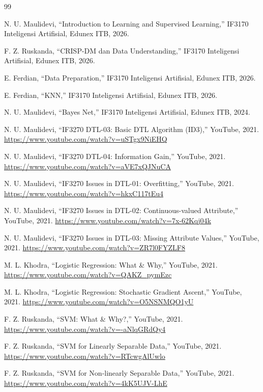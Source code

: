 \begin{thebibliography}{99}

 N. U. Maulidevi, ``Introduction to Learning and Supervised Learning,'' IF3170 Inteligensi Artifisial, Edunex ITB, 2026.

 F. Z. Ruskanda, ``CRISP-DM dan Data Understanding,'' IF3170 Inteligensi Artifisial, Edunex ITB, 2026.

 E. Ferdian, ``Data Preparation,'' IF3170 Inteligensi Artifisial, Edunex ITB, 2026.

 E. Ferdian, ``KNN,'' IF3170 Inteligensi Artifisial, Edunex ITB, 2026.

 N. U. Maulidevi, ``Bayes Net,'' IF3170 Inteligensi Artifisial, Edunex ITB, 2024.

 N. U. Maulidevi, ``IF3270 DTL-03: Basic DTL Algorithm (ID3),'' YouTube, 2021. \url{https://www.youtube.com/watch?v=uSTgx9NiEHQ}

 N. U. Maulidevi, ``IF3270 DTL-04: Information Gain,'' YouTube, 2021. \url{https://www.youtube.com/watch?v=aVE7xQJNuCA}

 N. U. Maulidevi, ``IF3270 Issues in DTL-01: Overfitting,'' YouTube, 2021. \url{https://www.youtube.com/watch?v=hkxC117tEu4}

 N. U. Maulidevi, ``IF3270 Issues in DTL-02: Continuous-valued Attribute,'' YouTube, 2021. \url{https://www.youtube.com/watch?v=7x-62Kqj04k}

 N. U. Maulidevi, ``IF3270 Issues in DTL-03: Missing Attribute Values,'' YouTube, 2021. \url{https://www.youtube.com/watch?v=ZR7l0FYZLF8}

 M. L. Khodra, ``Logistic Regression: What \& Why,'' YouTube, 2021. \url{https://www.youtube.com/watch?v=QAKZ_pymEzc}

 M. L. Khodra, ``Logistic Regression: Stochastic Gradient Ascent,'' YouTube, 2021. \url{https://www.youtube.com/watch?v=O5NSNMQO1yU}

 F. Z. Ruskanda, ``SVM: What \& Why?,'' YouTube, 2021. \url{https://www.youtube.com/watch?v=-aNlqGRdQy4}

 F. Z. Ruskanda, ``SVM for Linearly Separable Data,'' YouTube, 2021. \url{https://www.youtube.com/watch?v=RTcwgAlUwlo}

 F. Z. Ruskanda, ``SVM for Non-linearly Separable Data,'' YouTube, 2021. \url{https://www.youtube.com/watch?v=4kK5UJV-LhE}


\end{thebibliography}
